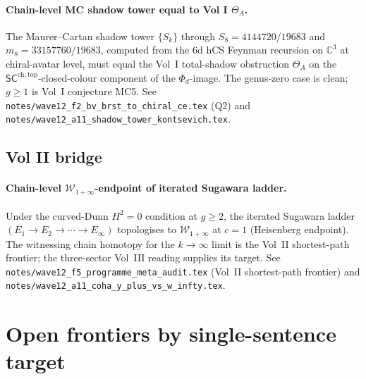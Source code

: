 \documentclass[11pt]{article}
\providecommand{\C}{\mathbb{C}}
\providecommand{\Eone}{E_1}
\providecommand{\Etwo}{E_2}
\providecommand{\Einf}{E_\infty}
\begin{document}
\paragraph{Chain-level MC shadow tower equal to Vol I $\Theta_A$.}
The Maurer--Cartan shadow tower $\{S_k\}$ through $S_8 = 4144720/19683$
and $m_8 = 33157760/19683$, computed from the 6d hCS Feynman
recursion on $\C^3$ at chiral-avatar level, must equal the Vol~I
total-shadow obstruction $\Theta_A$ on the
$\mathsf{SC}^{\mathrm{ch, top}}$-closed-colour component of the
$\Phi_d$-image. The genus-zero case is clean; $g \geq 1$ is Vol~I
conjecture MC5. See
\texttt{notes/wave12\_f2\_bv\_brst\_to\_chiral\_ce.tex} (Q2) and
\texttt{notes/wave12\_a11\_shadow\_tower\_kontsevich.tex}.

\subsection{Vol II bridge}

\paragraph{Chain-level $\mathcal{W}_{1+\infty}$-endpoint of iterated
Sugawara ladder.} Under the curved-Dunn $H^2 = 0$ condition at
$g \geq 2$, the iterated Sugawara ladder $(\Eone \to \Etwo \to
\cdots \to \Einf)$ topologises to $\mathcal{W}_{1+\infty}$ at
$c = 1$ (Heisenberg endpoint). The witnessing chain homotopy for
the $k \to \infty$ limit is the Vol~II shortest-path frontier; the
three-sector Vol~III reading supplies its target. See
\texttt{notes/wave12\_f5\_programme\_meta\_audit.tex}
(Vol~II shortest-path frontier) and
\texttt{notes/wave12\_a11\_coha\_y\_plus\_vs\_w\_infty.tex}.

\section{Open frontiers by single-sentence target}
\end{document}
